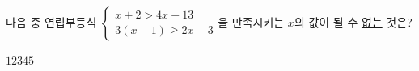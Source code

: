다음 중 연립부등식 $\begin{cases} x+2>4x-13 \\ 3(x-1)\ge 2x-3 \end{cases}$을 만족시키는 $x$의 값이 될 수 \underline{없는} 것은?
\begin{choices32}{$1$}{$2$}{$3$}{$4$}{$5$}\end{choices32}
